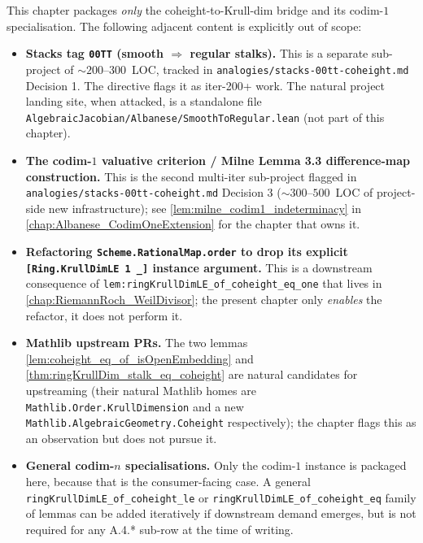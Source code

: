 This chapter packages \emph{only} the coheight-to-Krull-dim bridge and its
codim-\(1\) specialisation. The following adjacent content is explicitly out
of scope:
\begin{itemize}
  \item \textbf{Stacks tag \texttt{00TT} (smooth \(\Rightarrow\) regular stalks).}
    This is a separate sub-project of \(\sim 200\)--\(300\)~LOC, tracked in
    \texttt{analogies/stacks-00tt-coheight.md} Decision 1. The directive
    flags it as iter-200+ work. The natural project landing site, when
    attacked, is a standalone file
    \texttt{AlgebraicJacobian/Albanese/SmoothToRegular.lean} (not part of
    this chapter).
  \item \textbf{The codim-\(1\) valuative criterion / Milne Lemma 3.3
    difference-map construction.} This is the second multi-iter sub-project
    flagged in \texttt{analogies/stacks-00tt-coheight.md} Decision 3
    (\(\sim 300\)--\(500\)~LOC of project-side new infrastructure); see
    \cref{lem:milne_codim1_indeterminacy} in
    \cref{chap:Albanese_CodimOneExtension} for the chapter that owns it.
  \item \textbf{Refactoring \texttt{Scheme.RationalMap.order} to drop its
    explicit \texttt{[Ring.KrullDimLE 1 \_]} instance argument.} This is a
    downstream consequence of \texttt{lem:ringKrullDimLE_of_coheight_eq_one}
    that lives in \cref{chap:RiemannRoch_WeilDivisor}; the present chapter
    only \emph{enables} the refactor, it does not perform it.
  \item \textbf{Mathlib upstream PRs.} The two lemmas
    \cref{lem:coheight_eq_of_isOpenEmbedding} and
    \cref{thm:ringKrullDim_stalk_eq_coheight} are natural candidates for
    upstreaming (their natural Mathlib homes are
    \texttt{Mathlib.Order.KrullDimension} and a new
    \texttt{Mathlib.AlgebraicGeometry.Coheight} respectively); the chapter
    flags this as an observation but does not pursue it.
  \item \textbf{General codim-\(n\) specialisations.} Only the codim-\(1\)
    instance is packaged here, because that is the consumer-facing case.
    A general \texttt{ringKrullDimLE\_of\_coheight\_le} or
    \texttt{ringKrullDimLE\_of\_coheight\_eq} family of lemmas can be added
    iteratively if downstream demand emerges, but is not required for any
    A.4.* sub-row at the time of writing.
\end{itemize}
